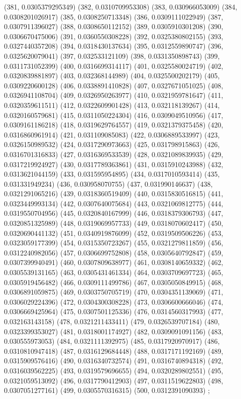 {					(381, 0.0305379295349)
					(382, 0.0310709953308)
					(383, 0.030966053009)
					(384, 0.0308201026917)
					(385, 0.0308250713348)
					(386, 0.0309111022949)
					(387, 0.0307911396027)
					(388, 0.0308650112152)
					(389, 0.0305910301208)
					(390, 0.0306670475006)
					(391, 0.0360550308228)
					(392, 0.0325380802155)
					(393, 0.0327440357208)
					(394, 0.0318430137634)
					(395, 0.0312559890747)
					(396, 0.0325620079041)
					(397, 0.032533121109)
					(398, 0.0331350898743)
					(399, 0.0311731052399)
					(400, 0.0316699314117)
					(401, 0.0325580024719)
					(402, 0.0320839881897)
					(403, 0.032368144989)
					(404, 0.0325500202179)
					(405, 0.0309220600128)
					(406, 0.0338891410828)
					(407, 0.0327671051025)
					(408, 0.0326941108704)
					(409, 0.0326950263977)
					(410, 0.0321959781647)
					(411, 0.0320359611511)
					(412, 0.0322609901428)
					(413, 0.032118139267)
					(414, 0.0320160579681)
					(415, 0.0311050224304)
					(416, 0.0309049510956)
					(417, 0.0309161186218)
					(418, 0.0319629764557)
					(419, 0.0321379375458)
					(420, 0.0316860961914)
					(421, 0.031109085083)
					(422, 0.0306889533997)
					(423, 0.0326150989532)
					(424, 0.0317290973663)
					(425, 0.031798915863)
					(426, 0.0316701316833)
					(427, 0.0316369533539)
					(428, 0.0321089839935)
					(429, 0.0317219924927)
					(430, 0.0317789363861)
					(431, 0.0315910243988)
					(432, 0.0313621044159)
					(433, 0.031595954895)
					(434, 0.0317010593414)
					(435, 0.031331949234)
					(436, 0.030958070755)
					(437, 0.031990146637)
					(438, 0.0321291065216)
					(439, 0.0318360519409)
					(440, 0.0315830516815)
					(441, 0.0323449993134)
					(442, 0.0307640075684)
					(443, 0.0321069812775)
					(444, 0.0319550704956)
					(445, 0.0320840167999)
					(446, 0.0318379306793)
					(447, 0.0320851325989)
					(448, 0.0319069957733)
					(449, 0.0318070602417)
					(450, 0.0320690441132)
					(451, 0.0340919876099)
					(452, 0.0319509506226)
					(453, 0.0323059177399)
					(454, 0.0315350723267)
					(455, 0.0321279811859)
					(456, 0.0312240982056)
					(457, 0.0306699752808)
					(458, 0.0305640792847)
					(459, 0.0307399940491)
					(460, 0.0307809638977)
					(461, 0.0308140659332)
					(462, 0.0305539131165)
					(463, 0.0305431461334)
					(464, 0.0303709697723)
					(465, 0.0305919456482)
					(466, 0.0309111499786)
					(467, 0.0305050849915)
					(468, 0.0306891059875)
					(469, 0.0303750705719)
					(470, 0.0304351139069)
					(471, 0.0306029224396)
					(472, 0.0304300308228)
					(473, 0.0306600666046)
					(474, 0.0306669425964)
					(475, 0.0307501125336)
					(476, 0.0314560317993)
					(477, 0.032163143158)
					(478, 0.0321211433411)
					(479, 0.0326539707184)
					(480, 0.0323399353027)
					(481, 0.0318001174927)
					(482, 0.0309091091156)
					(483, 0.030555973053)
					(484, 0.0321111392975)
					(485, 0.0317920970917)
					(486, 0.0310810947418)
					(487, 0.0316129684448)
					(488, 0.0317171192169)
					(489, 0.0315909576416)
					(490, 0.0316340732574)
					(491, 0.0316740894318)
					(492, 0.0316039562225)
					(493, 0.0319579696655)
					(494, 0.0320289802551)
					(495, 0.0321059513092)
					(496, 0.0317790412903)
					(497, 0.0311519622803)
					(498, 0.0307051277161)
					(499, 0.0305570316315)
					(500, 0.0312391090393)
				};

